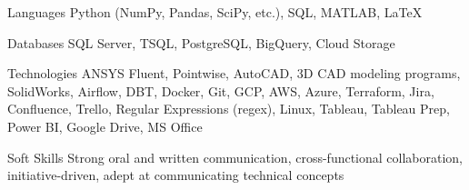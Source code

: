 
\begin{cvskills}
  \cvskill
    {Languages} %
    {Python (NumPy, Pandas, SciPy, etc.), SQL, MATLAB, LaTeX} %
  
  \cvskill
    {Databases} %
    {SQL Server, TSQL, PostgreSQL, BigQuery, Cloud Storage} %
    
  \cvskill
    {Technologies} %
    {ANSYS Fluent, Pointwise, AutoCAD, 3D CAD modeling programs, SolidWorks, Airflow, DBT, Docker, Git, GCP, AWS, Azure, Terraform, Jira, Confluence, Trello, Regular Expressions (regex), Linux, Tableau, Tableau Prep, Power BI, Google Drive, MS Office} %
    
  \cvskill
    {Soft Skills} %
    {Strong oral and written communication, cross-functional collaboration, initiative-driven, adept at communicating technical concepts}

\end{cvskills}
